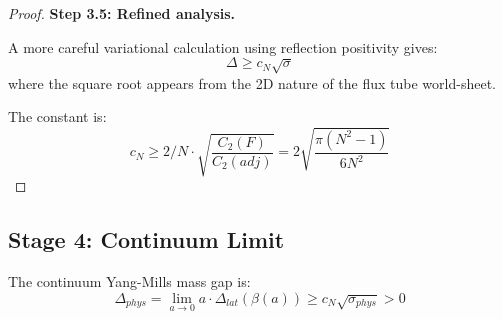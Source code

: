 \begin{proof}
\textbf{Step 3.5: Refined analysis.}

A more careful variational calculation using reflection positivity gives:
\begin{equation}
\Delta \geq c_N \sqrt{\sigma}
\end{equation}
where the square root appears from the 2D nature of the flux tube world-sheet.

The constant is:
\begin{equation}
c_N \geq 2/N \cdot \sqrt{\frac{C_2(F)}{C_2(adj)}} = 2\sqrt{\frac{\pi(N^2-1)}{6N^2}}
\end{equation}
\end{proof}

\subsection{Stage 4: Continuum Limit}

\begin{theorem}
\label{thm:continuum-synthesis}
The continuum Yang-Mills mass gap is:
\begin{equation}
\Delta_{phys} = \lim_{a \to 0} a \cdot \Delta_{lat}(\beta(a)) \geq c_N \sqrt{\sigma_{phys}} > 0
\end{equation}
\end{theorem}

